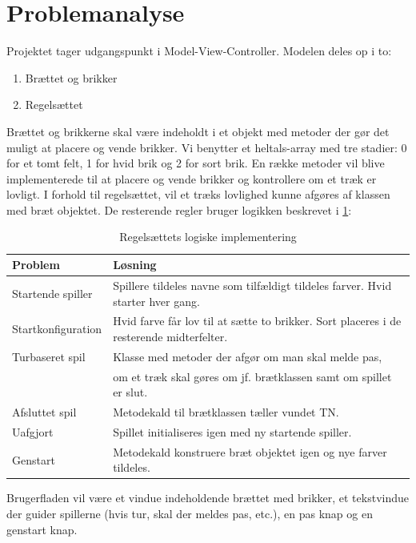 \documentclass[a4paper, danish]{article}
\numberwithin{equation}{section}
\begin{document}
\section{Problemanalyse}
Projektet tager udgangspunkt i Model-View-Controller. Modelen deles op i to:
\begin{enumerate}
    \item Brættet og brikker
    \item Regelsættet
\end{enumerate}
Brættet og brikkerne skal være indeholdt i et objekt med metoder der gør det muligt at placere og vende brikker. Vi benytter et heltals-array med tre stadier: 0 for et tomt felt, 1 for hvid brik og 2 for sort brik. En række metoder vil blive implementerede til at placere og vende brikker og kontrollere om et træk er lovligt.\newline
I forhold til regelsættet, vil et træks lovlighed kunne afgøres af klassen med bræt objektet. De resterende regler bruger logikken beskrevet i \cref{tbl:logic}:
\begin{table}[H]
    \centering
    \caption{Regelsættets logiske implementering}\label{tbl:logic}
    \begin{tabular}{ll}
        \toprule
        Problem            & Løsning                                                                                 \\
        \midrule
        Startende spiller  & Spillere tildeles navne som tilfældigt tildeles farver. Hvid starter hver gang.         \\
        Startkonfiguration & Hvid farve får lov til at sætte to brikker. Sort placeres i de resterende midterfelter. \\
        Turbaseret spil    & Klasse med metoder der afgør om man skal melde pas,                                     \\
                           & om et træk skal gøres om jf. brætklassen samt om spillet er slut.                       \\
        Afsluttet spil     & Metodekald til brætklassen tæller vundet TN.                                            \\
        Uafgjort           & Spillet initialiseres igen med ny startende spiller.                                    \\
        Genstart           & Metodekald konstruere bræt objektet igen og nye farver tildeles.                        \\
        \bottomrule
    \end{tabular}
\end{table}
Brugerfladen vil være et vindue indeholdende brættet med brikker, et tekstvindue der guider spillerne (hvis tur, skal der meldes pas, etc.), en pas knap og en genstart knap.
\end{document}
